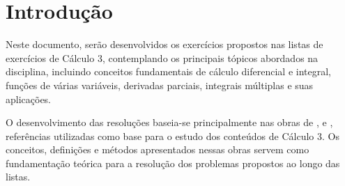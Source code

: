 \section{Introdução}

Neste documento, serão desenvolvidos os exercícios propostos nas listas de
exercícios de Cálculo 3, contemplando os principais tópicos abordados na
disciplina, incluindo conceitos fundamentais de cálculo diferencial e integral,
funções de várias variáveis, derivadas parciais, integrais múltiplas e suas
aplicações.

O desenvolvimento das resoluções baseia-se principalmente nas obras de
\citeauthor{anton2007calculo} \cite{anton2007calculo},
\citeauthor{stewart2009calculo} \cite{stewart2009calculo} e
\citeauthor{zill2009matematica} \cite{zill2009matematica}, referências
utilizadas como base para o estudo dos conteúdos de Cálculo 3. Os conceitos,
definições e métodos apresentados nessas obras servem como fundamentação
teórica para a resolução dos problemas propostos ao longo das listas.
